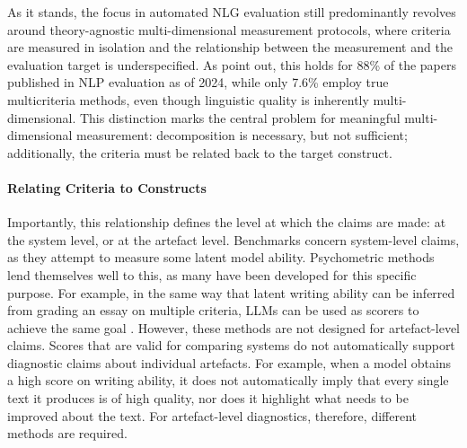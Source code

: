 
As it stands, the focus in automated NLG evaluation still predominantly revolves around theory-agnostic multi-dimensional measurement protocols, where criteria are measured in isolation and the relationship between the measurement and the evaluation target is underspecified. As \citet{arias2025statistical} point out, this holds for 88\% of the papers published in NLP evaluation as of 2024, while only 7.6\% employ true multicriteria methods, even though linguistic quality is inherently multi-dimensional. This distinction marks the central problem for meaningful multi-dimensional measurement: decomposition is necessary, but not sufficient; additionally, the criteria must be related back to the target construct.

\paragraph{Relating Criteria to Constructs}

Importantly, this relationship defines the level at which the claims are made: at the system level, or at the artefact level. Benchmarks concern system-level claims, as they attempt to measure some latent model ability. Psychometric methods lend themselves well to this, as many have been developed for this specific purpose. For example, in the same way that latent writing ability can be inferred from grading an essay on multiple criteria, LLMs can be used as scorers to achieve the same goal \citep{wang2025evaluating}. However, these methods are not designed for artefact-level claims. Scores that are valid for comparing systems do not automatically support diagnostic claims about individual artefacts. For example, when a model obtains a high score on writing ability, it does not automatically imply that every single text it produces is of high quality, nor does it highlight what needs to be improved about the text. For artefact-level diagnostics, therefore, different methods are required.

